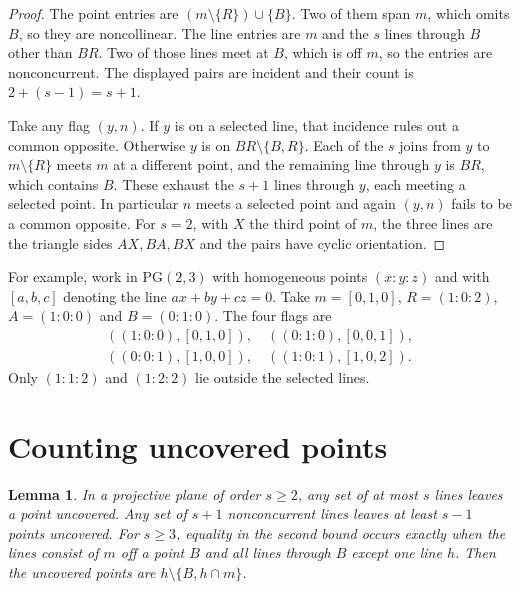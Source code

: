 \documentclass[11pt,a4paper]{amsart}
\newtheorem{lemma}[theorem]{Lemma}
\newcommand{\PG}{\mathrm{PG}}
\begin{document}
\begin{proof}
The point entries are \((m\setminus\{R\})\cup\{B\}\). Two of them span \(m\), which omits \(B\), so they are noncollinear. The line entries are \(m\) and the \(s\) lines through \(B\) other than \(BR\). Two of those lines meet at \(B\), which is off \(m\), so the entries are nonconcurrent. The displayed pairs are incident and their count is \(2+(s-1)=s+1\).

Take any flag \((y,n)\). If \(y\) is on a selected line, that incidence rules out a common opposite. Otherwise \(y\) is on \(BR\setminus\{B,R\}\). Each of the \(s\) joins from \(y\) to \(m\setminus\{R\}\) meets \(m\) at a different point, and the remaining line through \(y\) is \(BR\), which contains \(B\). These exhaust the \(s+1\) lines through \(y\), each meeting a selected point. In particular \(n\) meets a selected point and again \((y,n)\) fails to be a common opposite. For \(s=2\), with \(X\) the third point of \(m\), the three lines are the triangle sides \(AX,BA,BX\) and the pairs have cyclic orientation.
\end{proof}

For example, work in \(\PG(2,3)\) with homogeneous points \((x:y:z)\) and with \([a,b,c]\) denoting the line \(ax+by+cz=0\). Take \(m=[0,1,0]\), \(R=(1:0:2)\), \(A=(1:0:0)\) and \(B=(0:1:0)\). The four flags are
\[
\begin{gathered}
((1:0:0),[0,1,0]),\quad ((0:1:0),[0,0,1]),\\
((0:0:1),[1,0,0]),\quad ((1:0:1),[1,0,2]).
\end{gathered}
\]
Only \((1:1:2)\) and \((1:2:2)\) lie outside the selected lines.

\section{Counting uncovered points}

\begin{lemma}\label{lem:uncovered}
In a projective plane of order \(s\geq2\), any set of at most \(s\) lines leaves a point uncovered. Any set of \(s+1\) nonconcurrent lines leaves at least \(s-1\) points uncovered. For \(s\geq3\), equality in the second bound occurs exactly when the lines consist of \(m\) off a point \(B\) and all lines through \(B\) except one line \(h\). Then the uncovered points are \(h\setminus\{B,h\cap m\}\).
\end{lemma}
\end{document}
